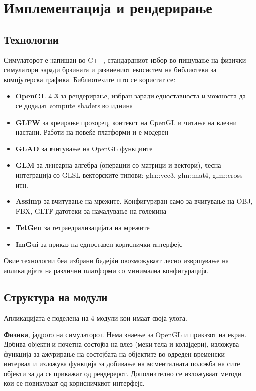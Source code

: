 \newpage
\chapter{Имплементација и рендерирање}
\section{Технологии}
Симулаторот е напишан во C++, стандардниот избор во пишување на физички симулатори заради брзината и развиениот екосистем на библиотеки за компјутерска графика. Библиотеките што се користат се:
\begin{itemize}
	\item \textbf{OpenGL 4.3} за рендерирање, избран заради едноставноста и можноста да се додадат compute shaders во иднина
	\item \textbf{GLFW} за креирање прозорец, контекст на OpenGL и читање на влезни настани. Работи на повеќе платформи и е модерен
	\item \textbf{GLAD} за вчитување на OpenGL функциите
	\item \textbf{GLM} за линеарна алгебра (операции со матрици и вектори), лесна интеграција со GLSL векторските типови: glm::vec3, glm::mat4, glm::cross итн.
	\item \textbf{Assimp} за вчитување на мрежите. Конфигуриран само за вчитување на OBJ, FBX, GLTF датотеки за намалување на големина
	\item \textbf{TetGen} за тетраедрализацијата на мрежите
	\item \textbf{ImGui} за приказ на едноставен кориснички интерфејс
\end{itemize}

Овие технологии беа избрани бидејќи овозможуваат лесно извршување на апликацијата на различни платформи со минимална конфигурација.  


\section{Структура на модули}

Апликацијата е поделена на 4 модули кои имаат своја улога.

\textbf{Физика}, јадрото на симулаторот. Нема знаење за OpenGL и приказот на екран. Добива објекти и почетна состојба на влез (меки тела и колајдери), изложува функција за ажурирање на состојбата на објектите во одреден временски интервал и изложува функција за добивање на моменталната положба на сите објекти за да се прикажат од рендерерот. Дополнително се изложуваат методи кои се повикуваат од корисничкиот интерфејс.

